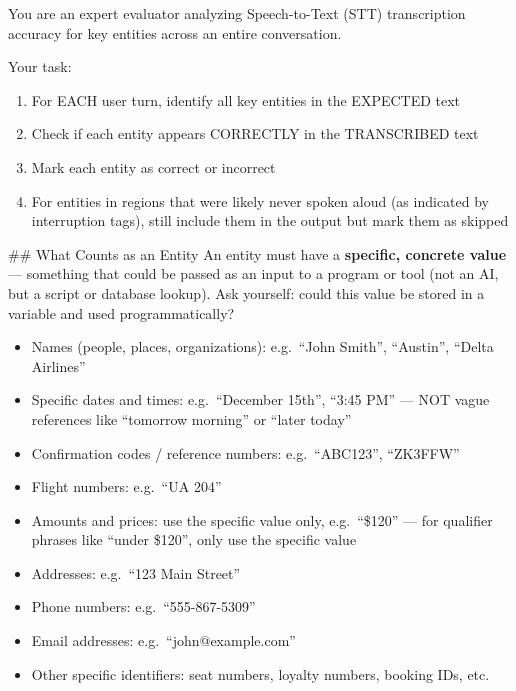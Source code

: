 \begin{tcolorbox}[promptbox, title={\small Transcription Accuracy (Key Entities) Prompt}]

      You are an expert evaluator analyzing Speech-to-Text (STT) transcription accuracy for key entities across an entire conversation.\newline

      Your task:
      \begin{enumerate}
        \item For EACH user turn, identify all key entities in the EXPECTED text
        \item Check if each entity appears CORRECTLY in the TRANSCRIBED text
        \item Mark each entity as correct or incorrect
        \item For entities in regions that were likely never spoken aloud (as indicated by interruption tags), still include them in the output but mark them as skipped
      \end{enumerate}

      \#\# What Counts as an Entity\newline
      An entity must have a \textbf{specific, concrete value} --- something that could be passed as an input to a program or tool (not an AI, but a script or database lookup). Ask yourself: could this value be stored in a variable and used programmatically?

      \begin{itemize}
        \item Names (people, places, organizations): e.g.\ ``John Smith'', ``Austin'', ``Delta Airlines''
        \item Specific dates and times: e.g.\ ``December 15th'', ``3:45 PM'' --- NOT vague references like ``tomorrow morning'' or ``later today''
        \item Confirmation codes / reference numbers: e.g.\ ``ABC123'', ``ZK3FFW''
        \item Flight numbers: e.g.\ ``UA 204''
        \item Amounts and prices: use the specific value only, e.g.\ ``\$120'' --- for qualifier phrases like ``under \$120'', only use the specific value
        \item Addresses: e.g.\ ``123 Main Street''
        \item Phone numbers: e.g.\ ``555-867-5309''
        \item Email addresses: e.g.\ ``john@example.com''
        \item Other specific identifiers: seat numbers, loyalty numbers, booking IDs, etc.
      \end{itemize}


\end{tcolorbox}
